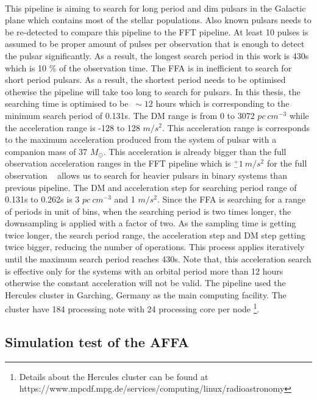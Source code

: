 \documentclass[../chapter1/thesis_msc.tex]{subfiles}
\begin{document}
\paragraph{} This pipeline is aiming to search for long period and dim pulsars in the Galactic plane which contains most of the stellar populations. Also known pulsars needs to be re-detected to compare this pipeline to the FFT pipeline. At least 10 pulses is assumed to be proper amount of pulses per observation that is enough to detect the pulsar significantly. As a result, the longest search period in this work is 430s which is 10 \% of the observation time. The FFA is in inefficient to search for short period pulsars. As a result, the shortest period needs to be optimised othewise the pipeline will take too long to search for pulsars. In this thesis, the searching time is optimised to be $~\sim 12$ hours which is corresponding to the minimum search period of 0.131s. The DM range is from 0 to 3072 $pc~cm^{-3}$ while the acceleration range is -128 to 128 $m/s^2$. This acceleration range is corresponds to the maximum acceleration produced from the system of pulsar with a companion mass of 37 $M_\odot$. This acceleration is already bigger than the full observation acceleration ranges in the FFT pipeline which is $^+_-1 ~m/s^2$ for the full observation ~\citep{ng2015high} allows us to search for heavier pulsars in binary systems than previous pipeline. The DM and acceleration step for searching period range of 0.131s to 0.262s is 3 $pc~cm^{-3}$ and 1 $m/s^2$. Since the FFA is searching for a range of periods in unit of bins, when the searching period is two times longer, the downsampling is applied with a factor of two. As the sampling time is getting twice longer, the search period range, the acceleration step and DM step getting twice bigger, reducing the number of operations. This process applies iteratively until the maximum search period reaches 430s. Note that, this acceleration search is effective only for the systems with an orbital period more than 12 hours otherwise the constant acceleration will not be valid. The pipeline used the Hercules cluster in Garching, Germany as the main computing facility. The cluster have 184 processing note with 24 processing core per node \footnote{ Details about the Hercules cluster can be found at https://www.mpcdf.mpg.de/services/computing/linux/radioastronomy}. 
\subsection{Simulation test of the AFFA}
\end{document}

